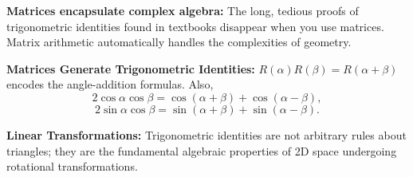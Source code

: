 \begin{takeaways}
\item \textbf{Matrices encapsulate complex algebra:} The long, tedious proofs of trigonometric identities found in textbooks disappear when you use matrices. Matrix arithmetic automatically handles the complexities of geometry.
\item \textbf{Matrices Generate Trigonometric Identities:} $R(\alpha)R(\beta)=R(\alpha+\beta)$ encodes the angle-addition formulas. Also,
\[
2\cos\alpha\cos\beta
=\cos(\alpha+\beta)+\cos(\alpha-\beta),
\]
\[
2\sin\alpha\cos\beta
=\sin(\alpha+\beta)+\sin(\alpha-\beta).
\]
\item \textbf{Linear Transformations:} Trigonometric identities are not arbitrary rules about triangles; they are the fundamental algebraic properties of 2D space undergoing rotational transformations.
\end{takeaways}

